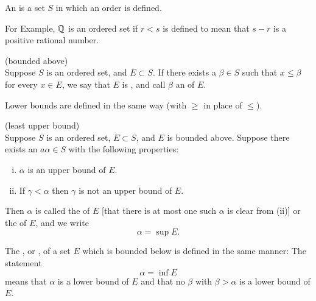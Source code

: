 \begin{mydef}
    \label{mydef:1.6}
An  is a set $S$ in which an order is defined.
\end{mydef}

For Example, ${\protect\mathbb Q} $ is an ordered set 
if $r<s$ is defined to mean that $s-r$ is a positive rational number.


\begin{mydef}
    \label{mydef:1.7}
    (bounded above)\\
    Suppose $S$ is an ordered set, and $E \subset S$. 
    If there exists a $\beta \in S$ 
    such that $x \leq \beta$ for every $x \in E$, 
    we say that $E$ is , and call
    $\beta$ an  of $E$.

    Lower bounds are defined in the same way (with $\geq$ in place of $\leq$).
\end{mydef}

\begin{mydef}
    \label{mydef:1.8}
    (least upper bound)\\
    Suppose $S$ is an ordered set, $E \subset S$, and $E$ is bounded above.
    Suppose there exists an $a\alpha \in S$ with the following properties:
    \begin{enumerate}[(i)]
        \item $\alpha$ is an upper bound of $E$.
        \item If $\gamma <\alpha$ then $\gamma$ is not an upper bound of $E$.
    \end{enumerate}

    Then $\alpha$ is called the  of $E$ 
    [that there is at most one such $\alpha$ is clear from (ii)] 
    or the  of $E$, and we write
    \begin{equation*}
        \alpha = \sup E.
    \end{equation*}

    The , or , 
    of a set $E$ which is bounded below is defined in the same manner: The statement
    \begin{equation*}
        \alpha = \inf E
    \end{equation*}
    means that $\alpha$ is a lower bound of $E$ and 
    that no $\beta$ with $\beta > \alpha$ is a lower bound
    of $E$.
\end{mydef}

